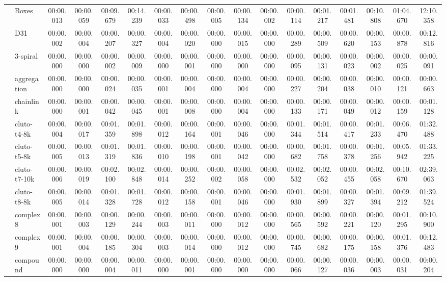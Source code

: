 {\begin{NiceTabular}{|rl|ccccccccc|cccccc|}
& Boxes & 00:00.013 & 00:00.059 & 00:09.679 & 00:14.239 & 00:00.033 & 00:00.498 & 00:00.005 & 00:00.134 & 00:00.002 & 00:00.114 & 00:01.217 & 00:01.481 & 00:10.808 & 01:04.670 & 12:10.358 \\
& D31 & 00:00.002 & 00:00.004 & 00:00.207 & 00:00.327 & 00:00.004 & 00:00.020 & 00:00.000 & 00:00.015 & 00:00.000 & 00:00.289 & 00:00.509 & 00:00.620 & 00:00.153 & 00:00.878 & 00:12.816 \\
& 3-spiral & 00:00.000 & 00:00.000 & 00:00.002 & 00:00.009 & 00:00.000 & 00:00.001 & 00:00.000 & 00:00.000 & 00:00.000 & 00:00.095 & 00:00.131 & 00:00.023 & 00:00.002 & 00:00.025 & 00:00.091 \\
& aggregation & 00:00.000 & 00:00.000 & 00:00.024 & 00:00.035 & 00:00.001 & 00:00.004 & 00:00.000 & 00:00.004 & 00:00.000 & 00:00.227 & 00:00.204 & 00:00.038 & 00:00.010 & 00:00.121 & 00:00.663 \\
& chainlink & 00:00.000 & 00:00.001 & 00:00.042 & 00:00.045 & 00:00.001 & 00:00.008 & 00:00.000 & 00:00.004 & 00:00.000 & 00:00.133 & 00:00.171 & 00:00.049 & 00:00.012 & 00:00.159 & 00:01.128 \\
& cluto-t4-8k & 00:00.004 & 00:00.017 & 00:01.359 & 00:01.898 & 00:00.012 & 00:00.164 & 00:00.001 & 00:00.046 & 00:00.000 & 00:01.344 & 00:01.514 & 00:00.417 & 00:01.233 & 00:06.470 & 01:32.488 \\
& cluto-t5-8k & 00:00.005 & 00:00.013 & 00:01.319 & 00:01.836 & 00:00.010 & 00:00.198 & 00:00.001 & 00:00.042 & 00:00.000 & 00:00.682 & 00:01.758 & 00:00.378 & 00:01.256 & 00:05.942 & 01:33.225 \\
& cluto-t7-10k & 00:00.006 & 00:00.019 & 00:02.100 & 00:02.848 & 00:00.014 & 00:00.252 & 00:00.002 & 00:00.058 & 00:00.000 & 00:02.532 & 00:02.052 & 00:00.455 & 00:02.058 & 00:10.670 & 02:39.063 \\
& cluto-t8-8k & 00:00.005 & 00:00.014 & 00:01.328 & 00:01.728 & 00:00.012 & 00:00.158 & 00:00.001 & 00:00.046 & 00:00.000 & 00:01.930 & 00:01.899 & 00:00.327 & 00:01.394 & 00:09.212 & 01:39.524 \\
& complex8 & 00:00.001 & 00:00.003 & 00:00.129 & 00:00.244 & 00:00.003 & 00:00.011 & 00:00.000 & 00:00.012 & 00:00.000 & 00:00.565 & 00:00.592 & 00:00.221 & 00:00.120 & 00:01.295 & 00:10.900 \\
& complex9 & 00:00.001 & 00:00.004 & 00:00.185 & 00:00.304 & 00:00.003 & 00:00.014 & 00:00.000 & 00:00.012 & 00:00.000 & 00:00.745 & 00:00.682 & 00:00.175 & 00:00.158 & 00:01.376 & 00:12.483 \\
& compound & 00:00.000 & 00:00.000 & 00:00.004 & 00:00.011 & 00:00.000 & 00:00.001 & 00:00.000 & 00:00.000 & 00:00.000 & 00:00.066 & 00:00.127 & 00:00.036 & 00:00.003 & 00:00.031 & 00:00.204 \\

\end{NiceTabular}}
